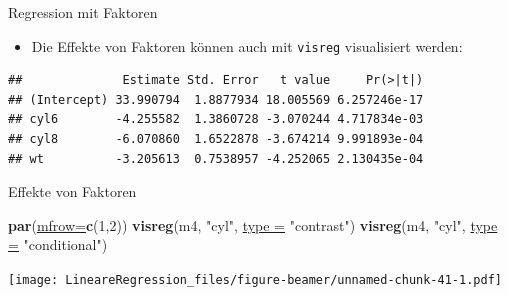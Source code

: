\documentclass[
  ignorenonframetext,
]{beamer}
\newenvironment{Shaded}{\begin{snugshade}}{\end{snugshade}}
\newcommand{\CommentTok}[1]{\textcolor[rgb]{0.00,0.40,1.00}{\textbf{\textit{#1}}}}
\newcommand{\DataTypeTok}[1]{\textcolor[rgb]{0.74,0.68,0.62}{\underline{#1}}}
\newcommand{\DecValTok}[1]{\textcolor[rgb]{0.27,0.67,0.26}{#1}}
\newcommand{\KeywordTok}[1]{\textcolor[rgb]{0.26,0.66,0.93}{\textbf{#1}}}
\newcommand{\NormalTok}[1]{\textcolor[rgb]{0.74,0.68,0.62}{#1}}
\newcommand{\OperatorTok}[1]{\textcolor[rgb]{0.74,0.68,0.62}{#1}}
\newcommand{\StringTok}[1]{\textcolor[rgb]{0.02,0.61,0.04}{#1}}
\providecommand{\tightlist}{%
  \setlength{\itemsep}{0pt}\setlength{\parskip}{0pt}}
\begin{document}
\begin{frame}[fragile]{Regression mit Faktoren}
\protect\hypertarget{regression-mit-faktoren}{}

\begin{itemize}
\tightlist
\item
  Die Effekte von Faktoren können auch mit \texttt{visreg} visualisiert
  werden:
\end{itemize}

\begin{Shaded}
\end{Shaded}

\begin{verbatim}
##              Estimate Std. Error   t value     Pr(>|t|)
## (Intercept) 33.990794  1.8877934 18.005569 6.257246e-17
## cyl6        -4.255582  1.3860728 -3.070244 4.717834e-03
## cyl8        -6.070860  1.6522878 -3.674214 9.991893e-04
## wt          -3.205613  0.7538957 -4.252065 2.130435e-04
\end{verbatim}

\end{frame}

\begin{frame}[fragile]{Effekte von Faktoren}
\protect\hypertarget{effekte-von-faktoren}{}

\begin{Shaded}
\begin{Highlighting}[]
\KeywordTok{par}\NormalTok{(}\DataTypeTok{mfrow=}\KeywordTok{c}\NormalTok{(}\DecValTok{1}\NormalTok{,}\DecValTok{2}\NormalTok{))}
\KeywordTok{visreg}\NormalTok{(m4, }\StringTok{"cyl"}\NormalTok{, }\DataTypeTok{type =} \StringTok{"contrast"}\NormalTok{)}
\KeywordTok{visreg}\NormalTok{(m4, }\StringTok{"cyl"}\NormalTok{, }\DataTypeTok{type =} \StringTok{"conditional"}\NormalTok{)}
\end{Highlighting}
\end{Shaded}

\texttt{[image: LineareRegression\_files/figure-beamer/unnamed-chunk-41-1.pdf]}

\end{frame}
\end{document}
